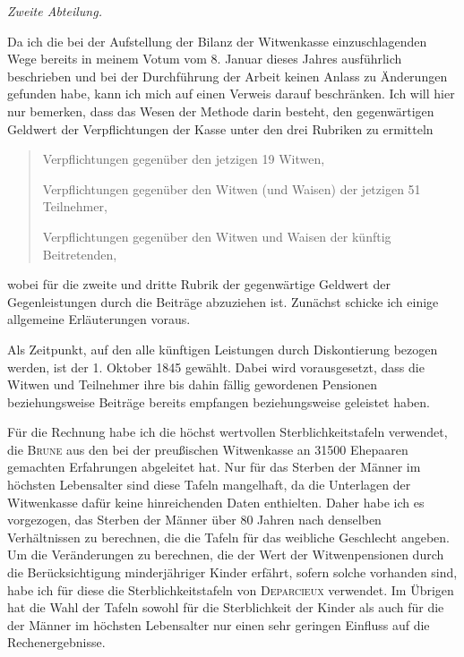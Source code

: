 \begin{center}\textit{Zweite Abteilung.}\end{center}
\noindent\hspace*{\parindent}
Da ich die bei der Aufstellung der Bilanz der Witwenkasse einzuschlagenden Wege bereits in meinem Votum vom 8. Januar dieses Jahres ausführlich beschrieben und bei der Durchführung der Arbeit keinen Anlass zu Änderungen gefunden habe, kann ich mich auf einen Verweis darauf beschränken. Ich will hier nur bemerken, dass das Wesen der Methode darin besteht, den gegenwärtigen Geldwert der Verpflichtungen der Kasse unter den drei Rubriken zu ermitteln
\begin{quote}
Verpflichtungen gegenüber den jetzigen 19 Witwen,\par
Verpflichtungen gegenüber den Witwen (und Waisen) der jetzigen 51 Teilnehmer,\par
Verpflichtungen gegenüber den Witwen und Waisen der künftig Beitretenden,
\end{quote}
\noindent wobei für die zweite und dritte Rubrik der gegenwärtige Geldwert der Gegenleistungen durch die Beiträge abzuziehen ist. Zunächst schicke ich einige allgemeine Erläuterungen voraus.

Als Zeitpunkt, auf den alle künftigen Leistungen durch Diskontierung bezogen werden, ist der 1. Oktober 1845 gewählt. Dabei wird vorausgesetzt, dass die Witwen und Teilnehmer ihre bis dahin fällig gewordenen Pensionen beziehungsweise Beiträge bereits empfangen beziehungsweise geleistet haben.
\par{}
Für die Rechnung habe ich die höchst wertvollen Sterblichkeitstafeln verwendet, die \textsc{Brune} aus den bei der preußischen Witwenkasse an 31500 Ehepaaren gemachten Erfahrungen abgeleitet hat. Nur für das Sterben der Männer im höchsten Lebensalter sind diese Tafeln mangelhaft, da die Unterlagen der Witwenkasse dafür keine hinreichenden Daten enthielten. Daher habe ich es vorgezogen, das Sterben der Männer über 80 Jahren nach denselben Verhältnissen zu berechnen, die die Tafeln für das weibliche Geschlecht angeben. Um die Veränderungen zu berechnen, die der Wert der Witwenpensionen durch die Berücksichtigung minderjähriger Kinder erfährt, sofern solche vorhanden sind, habe ich für diese die Sterblichkeitstafeln von \textsc{Deparcieux} verwendet. Im Übrigen hat die Wahl der Tafeln sowohl für die Sterblichkeit der Kinder als auch für die der Männer im höchsten Lebensalter nur einen sehr geringen Einfluss auf die Rechenergebnisse.

